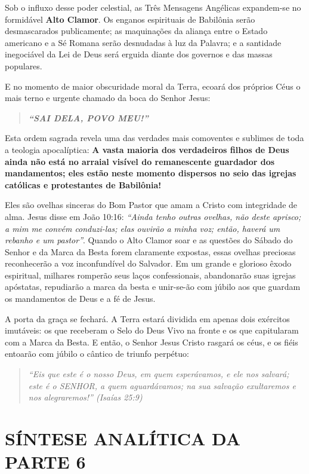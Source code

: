 Sob o influxo desse poder celestial, as Três Mensagens Angélicas expandem-se no formidável \textbf{Alto Clamor}. Os enganos espirituais de Babilônia serão desmascarados publicamente; as maquinações da aliança entre o Estado americano e a Sé Romana serão desnudadas à luz da Palavra; e a santidade inegociável da Lei de Deus será erguida diante dos governos e das massas populares.

E no momento de maior obscuridade moral da Terra, ecoará dos próprios Céus o mais terno e urgente chamado da boca do Senhor Jesus:


\begin{quote}
\itshape \textbf{``SAI DELA, POVO MEU!''}
\end{quote}


Esta ordem sagrada revela uma das verdades mais comoventes e sublimes de toda a teologia apocalíptica: \textbf{A vasta maioria dos verdadeiros filhos de Deus ainda não está no arraial visível do remanescente guardador dos mandamentos; eles estão neste momento dispersos no seio das igrejas católicas e protestantes de Babilônia!}

Eles são ovelhas sinceras do Bom Pastor que amam a Cristo com integridade de alma. Jesus disse em João 10:16: \textit{``Ainda tenho outras ovelhas, não deste aprisco; a mim me convém conduzi-las; elas ouvirão a minha voz; então, haverá um rebanho e um pastor''}. Quando o Alto Clamor soar e as questões do Sábado do Senhor e da Marca da Besta forem claramente expostas, essas ovelhas preciosas reconhecerão a voz inconfundível do Salvador. Em um grande e glorioso êxodo espiritual, milhares romperão seus laços confessionais, abandonarão suas igrejas apóstatas, repudiarão a marca da besta e unir-se-ão com júbilo aos que guardam os mandamentos de Deus e a fé de Jesus.

A porta da graça se fechará. A Terra estará dividida em apenas dois exércitos imutáveis: os que receberam o Selo do Deus Vivo na fronte e os que capitularam com a Marca da Besta. E então, o Senhor Jesus Cristo rasgará os céus, e os fiéis entoarão com júbilo o cântico de triunfo perpétuo:


\begin{quote}
\itshape \textit{``Eis que este é o nosso Deus, em quem esperávamos, e ele nos salvará; este é o SENHOR, a quem aguardávamos; na sua salvação exultaremos e nos alegraremos!''} (Isaías 25:9)
\end{quote}




\section{SÍNTESE ANALÍTICA DA PARTE 6}



